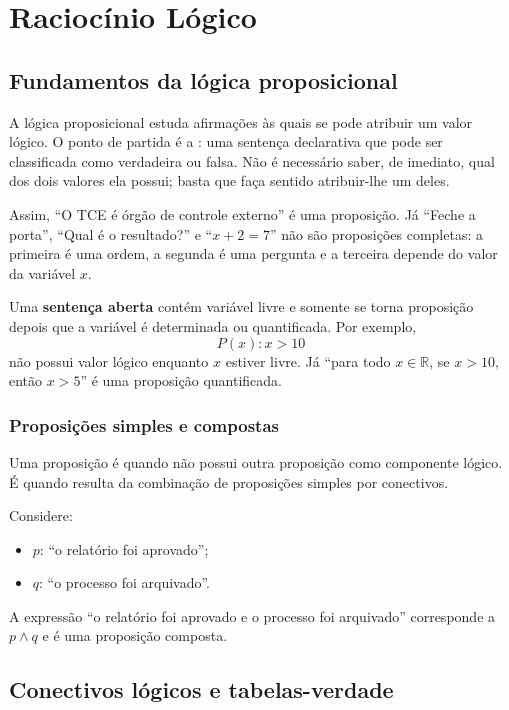 \chapter{Raciocínio Lógico}

\section{Fundamentos da lógica proposicional}

A lógica proposicional estuda afirmações às quais se pode atribuir um valor lógico. O ponto de partida é a : uma sentença declarativa que pode ser classificada como verdadeira ou falsa. Não é necessário saber, de imediato, qual dos dois valores ela possui; basta que faça sentido atribuir-lhe um deles.

Assim, ``O TCE é órgão de controle externo'' é uma proposição. Já ``Feche a porta'', ``Qual é o resultado?'' e ``$x+2=7$'' não são proposições completas: a primeira é uma ordem, a segunda é uma pergunta e a terceira depende do valor da variável $x$.

\begin{teoria}
Uma \textbf{sentença aberta} contém variável livre e somente se torna proposição depois que a variável é determinada ou quantificada. Por exemplo,
\[
P(x): x>10
\]
não possui valor lógico enquanto $x$ estiver livre. Já ``para todo $x\in\mathbb{R}$, se $x>10$, então $x>5$'' é uma proposição quantificada.
\end{teoria}

\subsection{Proposições simples e compostas}

Uma proposição é  quando não possui outra proposição como componente lógico. É  quando resulta da combinação de proposições simples por conectivos.

Considere:
\begin{itemize}
\item $p$: ``o relatório foi aprovado'';
\item $q$: ``o processo foi arquivado''.
\end{itemize}

A expressão ``o relatório foi aprovado e o processo foi arquivado'' corresponde a $p\land q$ e é uma proposição composta.

\section{Conectivos lógicos e tabelas-verdade}

